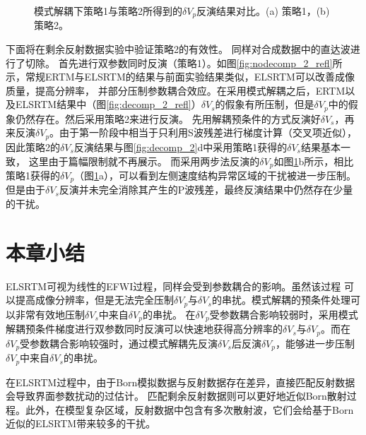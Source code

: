 \begin{figure}[!htb]
   \centering
   \caption{
   模式解耦下策略1与策略2所得到的$\delta
   V_p$反演结果对比。(a) 策略1，(b) 策略2。}
   \label{fig:final_comparison_2}
\end{figure}
下面将在剩余反射数据实验中验证策略2的有效性。
同样对合成数据中的直达波进行了切除。
首先进行双参数同时反演（策略1）。如图\ref{fig:nodecomp_2_refl}所示，常规ERTM与ELSRTM的结果与前面实验结果类似，ELSRTM可以改善成像质量，提高分辨率，
并部分压制参数耦合效应。在采用模式解耦之后，ERTM以及ELSRTM结果中（图\ref{fig:decomp_2_refl}）$\delta
V_s$的假象有所压制，但是$\delta
V_p$中的假象仍然存在。然后采用策略2来进行反演。
先用解耦预条件的方式反演好$\delta V_s$，再来反演$\delta
V_p$。由于第一阶段中相当于只利用S波残差进行梯度计算（交叉项近似），因此策略2的$\delta
V_s$反演结果与图\ref{fig:decomp_2}d中采用策略1获得的$\delta V_s$结果基本一致，
这里由于篇幅限制就不再展示。
而采用两步法反演的$\delta
V_p$如图\ref{fig:final_comparison_2}b所示，相比策略1获得的$\delta
V_p$（图\ref{fig:final_comparison_2}a），可以看到左侧速度结构异常区域的干扰被进一步压制。
但是由于$\delta V_s$反演并未完全消除其产生的P波残差，最终反演结果中仍然存在少量的干扰。
\section{本章小结}
ELSRTM可视为线性的EFWI过程，同样会受到参数耦合的影响。虽然该过程
可以提高成像分辨率，但是无法完全压制$\delta V_p$与$\delta V_s$的串扰。模式解耦的预条件处理可以非常有效地压制$\delta
V_s$中来自$\delta V_p$的串扰。
在$\delta V_p$受参数耦合影响较弱时，采用模式解耦预条件梯度进行双参数同时反演可以快速地获得高分辨率的$\delta
V_s$与$\delta V_p$。而在$\delta V_p$受参数耦合影响较强时，通过模式解耦先反演$\delta V_s$后反演$\delta
V_p$，能够进一步压制$\delta V_p$中来自$\delta V_s$的串扰。

在ELSRTM过程中，由于Born模拟数据与反射数据存在差异，直接匹配反射数据会导致界面参数扰动的过估计。
匹配剩余反射数据则可以更好地近似Born散射过程。此外，在模型复杂区域，反射数据中包含有多次散射波，它们会给基于Born近似的ELSRTM带来较多的干扰。

